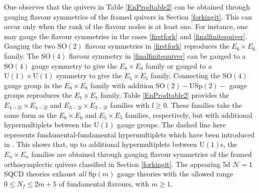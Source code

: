 \documentclass[a4paper,11pt]{article}
\newcommand{\Ncal}{\mathcal{N}}
\newcommand{\urm}{\mathrm{U}}
\newcommand{\sprm}{\mathrm{Sp}}
\newcommand{\usprm}{\mathrm{USp}}
\newcommand{\sorm}{\mathrm{SO}}
\begin{document}
One observes that the quivers in Table \ref{EnProdtable2} can be obtained through gauging flavour symmetries of the framed quivers in Section \ref{forkingit}. 
This can occur only when the rank of the flavour nodes is at least one. For instance, one may gauge the flavour symmetries in the cases \eqref{firstfork} and \eqref{finalfinitequiver}. Gauging the two $\sorm(2)$ flavour symmetries in \eqref{firstfork} reproduces the $E_6\times E_6 $ family. The $\sorm(4)$ flavour symmetry in \eqref{finalfinitequiver} can be gauged to a $\sorm(4)$ gauge symmetry to give the $E_8\times E_8$ family or gauged to a $\urm(1)\times \urm(1)$ symmetry to give the $E_5 \times E_5$ family. Connecting the $\sorm(4)$ gauge group in the $E_8\times E_8$ family with addition $\sorm(2)-\usprm(2)-$ gauge groups reproduces the $E_7\times E_7$ family. Table \ref{EnProdtable2} provides the $E_{4-2l}\times E_{4-2l}$ and $E_{3-2l} \times E_{3-2l}$ families with $l \geq 0$. These families take the same form as the $E_6\times E_6$ and $E_5 \times E_5$ families, respectively, but with additional hypermultiplets between the $\urm(1)$ gauge groups. The dashed line here represents fundamental-fundamental hypermultiplets which have been introduced in \cite{Akhond:2020vhc}. This shows that, up to additional hypermultiplets between $\urm(1)$s, the $E_n\times E_n$ families are obtained through gauging flavour symmetries of the framed orthosymplectic quivers classified in Section \ref{forkingit}. The appearing 5d $\Ncal=1$ SQCD theories exhaust \emph{all} $\sprm(m)$ gauge theories with the allowed range $0 \leq N_f \leq 2m+5$ of fundamental flavours, with $m\geq 1$. 
\end{document}
